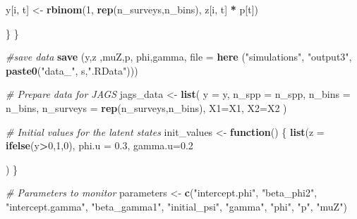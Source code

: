 \documentclass[
]{article}
\newenvironment{Shaded}{\begin{snugshade}}{\end{snugshade}}
\newcommand{\AttributeTok}[1]{\textcolor[rgb]{0.13,0.29,0.53}{#1}}
\newcommand{\CommentTok}[1]{\textcolor[rgb]{0.56,0.35,0.01}{\textit{#1}}}
\newcommand{\ControlFlowTok}[1]{\textcolor[rgb]{0.13,0.29,0.53}{\textbf{#1}}}
\newcommand{\DecValTok}[1]{\textcolor[rgb]{0.00,0.00,0.81}{#1}}
\newcommand{\FloatTok}[1]{\textcolor[rgb]{0.00,0.00,0.81}{#1}}
\newcommand{\FunctionTok}[1]{\textcolor[rgb]{0.13,0.29,0.53}{\textbf{#1}}}
\newcommand{\NormalTok}[1]{#1}
\newcommand{\OtherTok}[1]{\textcolor[rgb]{0.56,0.35,0.01}{#1}}
\newcommand{\SpecialCharTok}[1]{\textcolor[rgb]{0.81,0.36,0.00}{\textbf{#1}}}
\newcommand{\StringTok}[1]{\textcolor[rgb]{0.31,0.60,0.02}{#1}}
\begin{document}
{\begin{Shaded}
\begin{Highlighting}[]
\NormalTok{              y[i, t] }\OtherTok{\textless{}{-}} \FunctionTok{rbinom}\NormalTok{(}\DecValTok{1}\NormalTok{, }\FunctionTok{rep}\NormalTok{(n\_surveys,n\_bins), z[i, t] }\SpecialCharTok{*}\NormalTok{ p[t])}
            
\NormalTok{          \}}
\NormalTok{        \}}
        
        \CommentTok{\#save data}
        \FunctionTok{save}\NormalTok{ (y,z ,muZ,p, phi,gamma, }\AttributeTok{file =} \FunctionTok{here}\NormalTok{ (}\StringTok{"simulations"}\NormalTok{, }\StringTok{"output3"}\NormalTok{, }\FunctionTok{paste0}\NormalTok{(}\StringTok{"data\_"}\NormalTok{, s,}\StringTok{".RData"}\NormalTok{)))}
        
        \CommentTok{\# Prepare data for JAGS}
\NormalTok{        jags\_data }\OtherTok{\textless{}{-}} \FunctionTok{list}\NormalTok{(}
          \AttributeTok{y =}\NormalTok{ y,}
          \AttributeTok{n\_spp =}\NormalTok{ n\_spp,}
          \AttributeTok{n\_bins =}\NormalTok{ n\_bins,}
          \AttributeTok{n\_surveys =} \FunctionTok{rep}\NormalTok{(n\_surveys,n\_bins),}
          \AttributeTok{X1=}\NormalTok{X1,}
          \AttributeTok{X2=}\NormalTok{X2}
\NormalTok{        )}
        
        \CommentTok{\# Initial values for the latent states}
\NormalTok{        init\_values }\OtherTok{\textless{}{-}} \ControlFlowTok{function}\NormalTok{() \{}
          \FunctionTok{list}\NormalTok{(}\AttributeTok{z =} \FunctionTok{ifelse}\NormalTok{(y}\SpecialCharTok{\textgreater{}}\DecValTok{0}\NormalTok{,}\DecValTok{1}\NormalTok{,}\DecValTok{0}\NormalTok{),}
               \AttributeTok{phi.u =} \FloatTok{0.3}\NormalTok{,}
               \AttributeTok{gamma.u=}\FloatTok{0.2}
               
\NormalTok{               )}
\NormalTok{        \}}
        
        \CommentTok{\# Parameters to monitor}
\NormalTok{        parameters }\OtherTok{\textless{}{-}} \FunctionTok{c}\NormalTok{(}\StringTok{"intercept.phi"}\NormalTok{,}
                        \StringTok{"beta\_phi2"}\NormalTok{,}
                        \StringTok{"intercept.gamma"}\NormalTok{,}
                        \StringTok{"beta\_gamma1"}\NormalTok{,}
                        \StringTok{"initial\_psi"}\NormalTok{, }
                        \StringTok{"gamma"}\NormalTok{,}
                        \StringTok{"phi"}\NormalTok{,}
                        \StringTok{"p"}\NormalTok{, }
                        \StringTok{"muZ"}\NormalTok{)}
        

\end{Highlighting}
\end{Shaded}}
\end{document}
